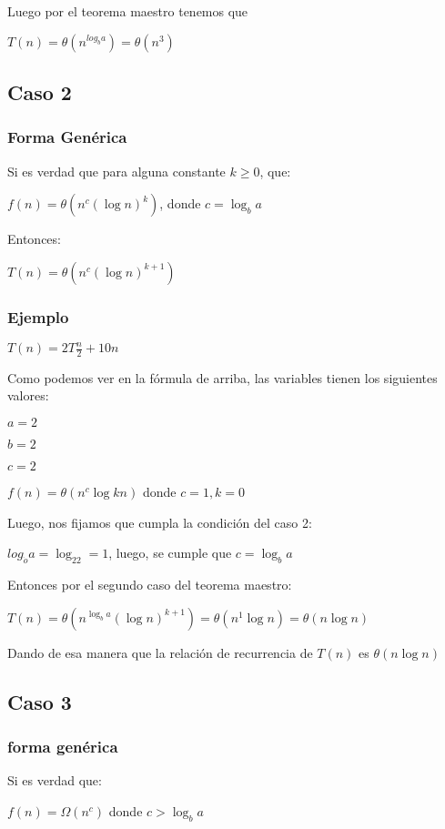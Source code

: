 \documentclass[12pt]{article} %
\begin{document}
Luego por el teorema maestro tenemos que

$T(n) = \theta (n^{log_ba})=\theta (n^3)$

\subsection{Caso 2}
\subsubsection{Forma Genérica}
Si es verdad que para alguna constante $k \geq 0$, que:

$ f(n)=\theta(n^{c} (\log n)^k)$, donde $c=\log_ba$

Entonces:

$T(n) = \theta(n^{c} (\log n)^{k+1})$



\subsubsection{Ejemplo}

$T(n) = 2T \frac{n}{2} + 10n$

Como podemos ver en la fórmula de arriba, las variables tienen los siguientes valores:

$a=2$

$b=2$

$c=2$

$f(n)=\theta(n^{c} \log k n)$ donde $c=1, k=0$

Luego, nos fijamos que cumpla la condición del caso 2:

$log_{\dot{o}}{a} = \log_22 = 1$, luego, se cumple que $c=\log_ba$

Entonces por el segundo caso del teorema maestro:

$T(n) = \theta (n^{\log_ba} (\log n)^{k+1}) = \theta (n^{1} \log n) = \theta (n \log n)$

Dando de esa manera que la relación de recurrencia de $T(n)$ es $\theta(n \log n)$

\subsection{Caso 3}
\subsubsection{forma genérica}
Si es verdad que:

$f(n) = \Omega (n^c)$ donde $c>\log_ba$
\end{document}
